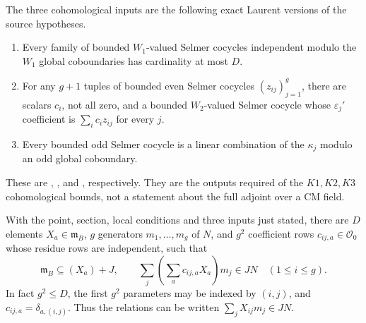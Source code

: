 The three cohomological inputs are the following exact Laurent
versions of the source hypotheses.
\begin{enumerate}
\item Every family of bounded $W_1$-valued Selmer cocycles
independent modulo the $W_1$ global coboundaries has cardinality
at most $D$.
\item For any $g+1$ tuples of bounded even Selmer cocycles
$(z_{ij})_{j=1}^g$, there are scalars $c_i$, not all zero, and
a bounded $W_2$-valued Selmer cocycle whose $\varepsilon_j'$
coefficient is $\sum_i c_i z_{ij}$ for every $j$.
\item Every bounded odd Selmer cocycle is a linear combination
of the $\kappa_j$ modulo an odd global coboundary.
\end{enumerate}
These are ,
, and
, respectively.
They are the outputs required of the $K1,K2,K3$ cohomological
bounds, not a statement about the full adjoint over a CM field.

\begin{srtheorem}
\label{thm:selmer-paired-pres}
With the point, section, local conditions and three inputs just
stated, there are $D$ elements $X_a\in\mathfrak m_B$, $g$ generators
$m_1,\ldots,m_g$ of $N$, and $g^2$ coefficient rows
$c_{ij,a}\in\mathcal O_0$ whose residue rows are independent, such
that
\[
 \mathfrak m_B\subseteq(X_a)+J,\qquad
 \sum_j\left(\sum_a c_{ij,a}X_a\right)m_j\in JN
                    \quad(1\leq i\leq g).                     \tag{13}
\]
In fact $g^2\leq D$, the first $g^2$ parameters may be indexed
by $(i,j)$, and $c_{ij,a}=\delta_{a,(i,j)}$.
Thus the relations can be written $\sum_jX_{ij}m_j\in JN$.
\end{srtheorem}

